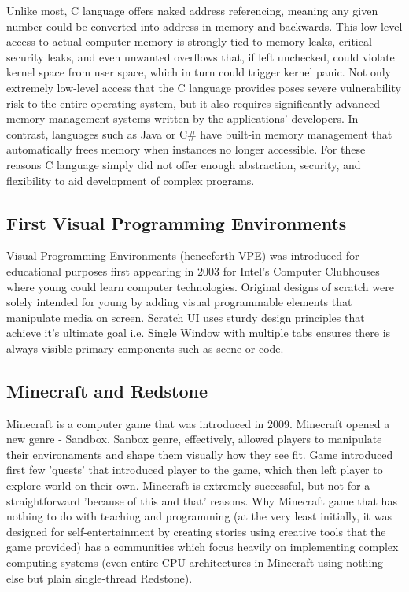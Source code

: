 \documentclass{article}
\begin{document}
Unlike most, C language offers naked address referencing, meaning any given number could be converted into address in memory and backwards. This low level access to actual computer memory is strongly tied to memory leaks, critical security leaks, and even unwanted overflows that, if left unchecked, could violate kernel space from user space, which in turn could trigger kernel panic.\citep{6234805} Not only extremely low-level access that the C language provides poses severe vulnerability risk to the entire operating system, but it also requires significantly advanced memory management systems written by the applications' developers. In contrast, languages such as Java or C\# have built-in memory management that automatically frees memory when instances no longer accessible.
For these reasons C language simply did not offer enough abstraction, security, and flexibility to aid development of complex programs.\citep{schmidt_1977_some}

\subsection{First Visual Programming Environments}
Visual Programming Environments (henceforth VPE) was introduced for educational purposes first appearing in 2003 for Intel's Computer Clubhouses where young could learn computer technologies. Original designs of scratch were solely intended for young by adding visual programmable elements that manipulate media on screen.\citep{demrkiran_2021_an}
Scratch UI uses sturdy design principles that achieve it's ultimate goal i.e. Single Window with multiple tabs ensures there is always visible primary components such as scene or code.

\subsection{Minecraft and Redstone}
Minecraft is a computer game that was introduced in 2009. Minecraft opened a new genre - Sandbox. Sanbox genre, effectively, allowed players to manipulate their environaments and shape them visually how they see fit. Game introduced first few 'quests' that introduced player to the game, which then left player to explore world on their own. Minecraft is extremely successful, but not for a straightforward 'because of this and that' reasons. \citep{baek_2020_mining}
Why Minecraft game that has nothing to do with teaching and programming\citep{baek_2020_mining} (at the very least initially, it was designed for self-entertainment by creating stories using creative tools that the game provided\citep{booch_2013_from}) has a communities which focus heavily on implementing complex computing systems (even entire CPU architectures in Minecraft using nothing else but plain single-thread Redstone).\citep{matteson_2017_a}
\end{document}
